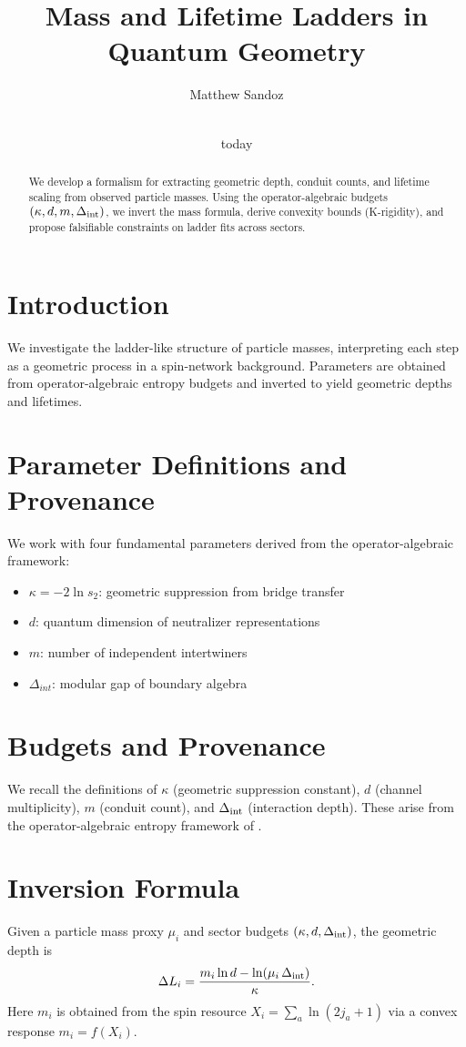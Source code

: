 \documentclass[11pt]{article}
\title{Mass and Lifetime Ladders in Quantum Geometry}
\author{Matthew Sandoz}
\date{\\today}
\theoremstyle{plain}
\theoremstyle{definition}
\begin{document}
\maketitle

\begin{abstract}
  We develop a formalism for extracting geometric depth, conduit counts, and lifetime scaling from observed particle masses. Using the operator-algebraic budgets $(\kappa,d,m,\Delta_{\rm int})$, we invert the mass formula, derive convexity bounds (K-rigidity), and propose falsifiable constraints on ladder fits across sectors.
\end{abstract}

\section{Introduction}
We investigate the ladder-like structure of particle masses, interpreting each step as a geometric process in a spin-network background. Parameters are obtained from operator-algebraic entropy budgets and inverted to yield geometric depths and lifetimes.

\section{Parameter Definitions and Provenance}
We work with four fundamental parameters derived from the operator-algebraic framework:
\begin{itemize}
  \item $\kappa = -2\ln s_2$: geometric suppression from bridge transfer
  \item $d$: quantum dimension of neutralizer representations
  \item $m$: number of independent intertwiners
  \item $\Delta_{int}$: modular gap of boundary algebra
\end{itemize}

\section{Budgets and Provenance}
We recall the definitions of $\kappa$ (geometric suppression constant), $d$ (channel multiplicity), $m$ (conduit count), and $\Delta_{\rm int}$ (interaction depth). These arise from the operator-algebraic entropy framework of \cite{bridge-monotonicity,entropy-rewrites,operator-theory}.

\section{Inversion Formula}
Given a particle mass proxy $\mu_i$ and sector budgets $(\kappa,d,\Delta_{\rm int})$, the geometric depth is
\begin{equation}
  \Delta L_i = \frac{m_i\ln d - \ln(\mu_i\,\Delta_{\rm int})}{\kappa}.
\end{equation}
Here $m_i$ is obtained from the spin resource $X_i = \sum_a \ln(2j_a+1)$ via a convex response $m_i = f(X_i)$.
\end{document}
